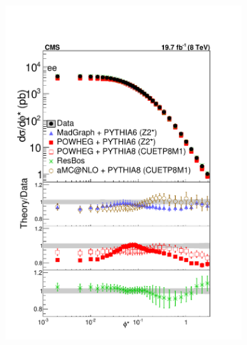 \label{jargonapp}
\begin{figure}
    \centering
   \begin{subfigure}[b]{0.49\textwidth}
    \includegraphics[width=\linewidth]{figures/AppendexA/ZShape_MGAndAMC_PowHegs_elec_Abs_Born.pdf}
    \end{subfigure}
    \begin{subfigure}[b]{0.49\textwidth}

\end{subfigure}
\end{figure}
